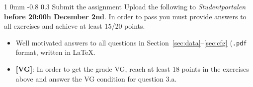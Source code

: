 \documentclass[10.9pt]{article}
\makeatletter
\newcommand{\newsec}[2]{\section{#1}\label{sec:#2}\noindent}
\renewcommand{\section}{\@startsection
{section}%
{1}%
{0mm}%
{-0.8\baselineskip}%
{0.3\baselineskip}%
{\bfseries\large}}%
\makeatother
\begin{document}
\newsec{Submit the assignment}{sub}%
Upload the following to {\it Studentportalen}
\textbf{before 20:00h December 2nd}. In order to pass you must provide
answers to all exercises and achieve at least 15/20 points.
\begin{itemize}[noitemsep,topsep=0.2cm]
\item Well motivated answers to all questions in
  Section~\ref{sec:data}--\ref{sec:cfg} (\texttt{.pdf} format, written
  in \LaTeX.
\item \textbf{[VG]}: In order to get the grade VG, reach at least 18
  points in the exercises above and answer the VG condition for question                     
  3.a.
\end{itemize}
\end{document}
